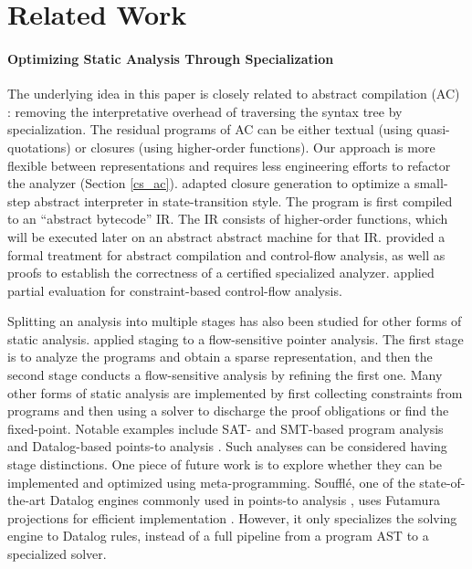 \section{Related Work}

\paragraph{Optimizing Static Analysis Through Specialization} The underlying
idea in this paper is closely related to abstract compilation (AC)
\cite{Boucher:1996:ACN:647473.727587}: removing the interpretative overhead of
traversing the syntax tree by specialization. The residual programs of AC can
be either textual (using quasi-quotations) or closures (using higher-order
functions).  Our approach is more flexible between representations and requires
less engineering efforts to refactor the analyzer (Section \ref{cs_ac}).
\citet{Johnson:2013:OAA:2500365.2500604} adapted closure generation to optimize a
small-step abstract interpreter in state-transition style. The program
is first compiled to an ``abstract bytecode'' IR. The IR consists of higher-order
functions, which will be executed later on an abstract abstract machine for
that IR.  \citet{damian1999partial} provided a formal treatment for abstract
compilation and control-flow analysis, as well as proofs to establish the
correctness of a certified specialized analyzer.  \citet{amtoft1999partial}
applied partial evaluation for constraint-based control-flow analysis.

Splitting an analysis into multiple stages has also been studied for other
forms of static analysis.
\citet{DBLP:conf/cgo/HardekopfL11} applied staging to a
flow-sensitive pointer analysis. The first stage is to analyze the
programs and obtain a sparse representation, and then the second
stage conducts a flow-sensitive analysis by refining the first
one. Many other forms of static analysis are implemented by
first collecting constraints from programs and then using a solver to discharge
the proof obligations or find the fixed-point. Notable examples include SAT-
and SMT-based program analysis
\cite{Gulwani:2008:PAC:1375581.1375616} and Datalog-based points-to
analysis \cite{Smaragdakis:2015:PA:2802194.2802195}.
Such analyses can be considered having stage distinctions.  One piece of future
work is to explore whether they can be implemented and optimized using
meta-programming.
Souffl{\'e}, one of the state-of-the-art Datalog engines commonly used in
points-to analysis \cite{Antoniadis:2017:PDS:3088515.3088522}, uses Futamura
projections for efficient implementation \cite{10.1007/978-3-319-41540-6_23}.
However, it only specializes the solving engine to Datalog rules, instead of a
full pipeline from a program AST to a specialized solver.

